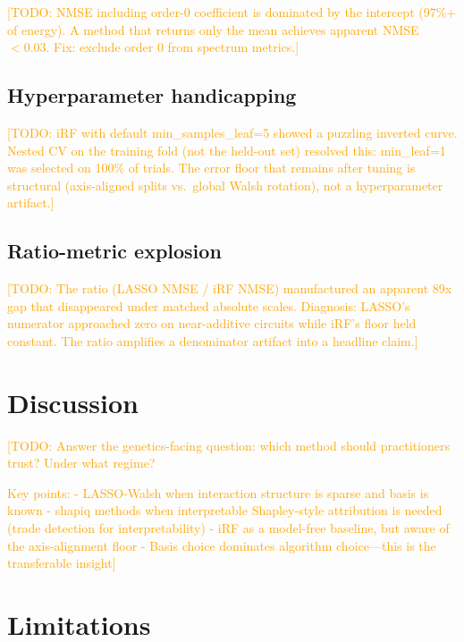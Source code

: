 \documentclass[11pt]{article}
\newcommand{\todo}[1]{\textcolor{orange}{[TODO: #1]}}
\begin{document}
\todo{NMSE including order-0 coefficient is dominated by the intercept
(97\%+ of energy). A method that returns only the mean achieves apparent
NMSE $< 0.03$. Fix: exclude order 0 from spectrum metrics.}

\subsection{Hyperparameter handicapping}

\todo{iRF with default min\_samples\_leaf=5 showed a puzzling inverted
curve. Nested CV on the training fold (not the held-out set) resolved
this: min\_leaf=1 was selected on 100\% of trials. The error floor that
remains after tuning is structural (axis-aligned splits vs.~global Walsh
rotation), not a hyperparameter artifact.}

\subsection{Ratio-metric explosion}

\todo{The ratio (LASSO NMSE / iRF NMSE) manufactured an apparent 89x
gap that disappeared under matched absolute scales. Diagnosis: LASSO's
numerator approached zero on near-additive circuits while iRF's floor
held constant. The ratio amplifies a denominator artifact into a
headline claim.}


\section{Discussion}
\label{sec:discussion}

\todo{Answer the genetics-facing question: which method should
practitioners trust? Under what regime?

Key points:
- LASSO-Walsh when interaction structure is sparse and basis is known
- shapiq methods when interpretable Shapley-style attribution is needed
  (trade detection for interpretability)
- iRF as a model-free baseline, but aware of the axis-alignment floor
- Basis choice dominates algorithm choice---this is the transferable insight}


\section{Limitations}
\label{sec:limitations}
\end{document}

